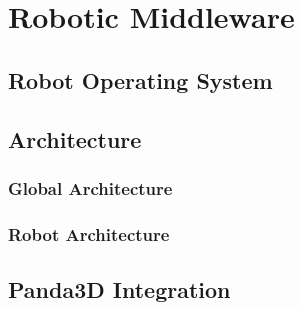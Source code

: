 \chapter{Robotic Middleware}

\section{Robot Operating System}

\section{Architecture}

\subsection{Global Architecture}

\subsection{Robot Architecture}

\section{Panda3D Integration}
